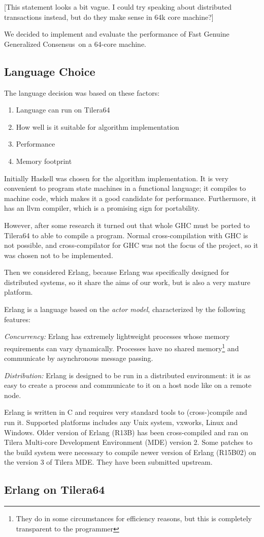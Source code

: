 \documentclass[english,11pt]{article}
\numberwithin{equation}{section}
\newcommand{\fggc}{Fast Genuine Generalized Consensus\ }
\begin{document}
[This statement looks a bit vague. I could try speaking about distributed
transactions instead, but do they make sense in 64k core machine?]

We decided to implement and evaluate the performance of \fggc on a 64-core
machine.

\subsection{Language Choice}

The language decision was based on these factors:
\begin{enumerate}
    \item Language can run on Tilera64
    \item How well is it suitable for algorithm implementation
    \item Performance
    \item Memory footprint
\end{enumerate}

Initially Haskell was chosen for the algorithm implementation. It is very
convenient to program state machines in a functional language; it compiles to
machine code, which makes it a good candidate for performance. Furthermore, it
has an llvm compiler, which is a promising sign for portability.

However, after some research it turned out that whole GHC must be ported to
Tilera64 to able to compile a program. Normal cross-compilation with GHC is not
possible, and cross-compilator for GHC was not the focus of the project, so it
was chosen not to be implemented.

Then we considered Erlang, because Erlang was specifically designed for
distributed systems, so it share the aims of our work, but is also a very
mature platform.

Erlang is a language based on the  {\em actor model}, characterized by the
following features:

{\em Concurrency:} Erlang has extremely lightweight processes whose memory
requirements can vary dynamically. Processes have no shared
memory\footnote{They do in some circumstances for efficiency reasons, but this
is completely transparent to the programmer} and communicate by asynchronous
message passing. 

{\em Distribution:} Erlang is designed to be run in a distributed
environment: it is as easy to create a process and communicate to
it on a host node like on a remote node.

Erlang is written in C and requires very standard tools to (cross-)compile and
run it. Supported platforms includes any Unix system, vxworks, Linux and
Windows. Older version of Erlang (R13B) has been cross-compiled and ran on
Tilera Multi-core Development Environment (MDE) version 2. Some patches to the
build system were necessary to compile newer version of Erlang (R15B02) on the
version 3 of Tilera MDE. They have been submitted upstream.

\subsection{Erlang on Tilera64}
\end{document}
